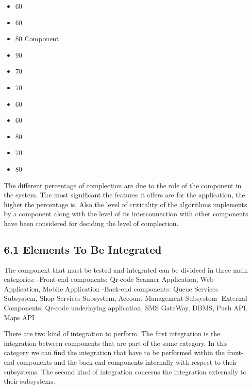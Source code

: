 \begin{itemize}
        \begin{itemize}
            \item 60%
            \item 60%
            \item 80%
            Component
            \item 90%
            \item 70%
            \item 70%
            \item  60%
            \item  60%
            \item 80%
            \item 70%
            \item 80%
        \end{itemize}
        The different percentage of complection are due to the role of the component in the system. The most significant the features it offers are for the application, the higher the percentage is. Also the level of criticality of the algorithms implements by a component along with the level of its interconnection with other components have been considered for deciding the level of complection.
\end{itemize}


\subsection{6.1 Elements To Be Integrated}
\label{subsect: entrycriteria}
The component that must be tested and integrated can be divideed in three main categories:
-Front-end components: Qr-code Scanner Application, Web Application, Mobile Application 
-Back-end components: Queue Services Subsystem, Shop Services Subsystem, Account Management Subsystem
-External Components: Qr-code underlaying application, SMS GateWay, DBMS, Push API, Maps API

There are two kind of integration to perform. The first integration is the integration between components that are part of the same category.
In this category we can find the integration that have to be performed within the front-end components and the back-end components internally with respect to their subsystems.
The second kind of integration concerns the integration externally to their subsystems.

